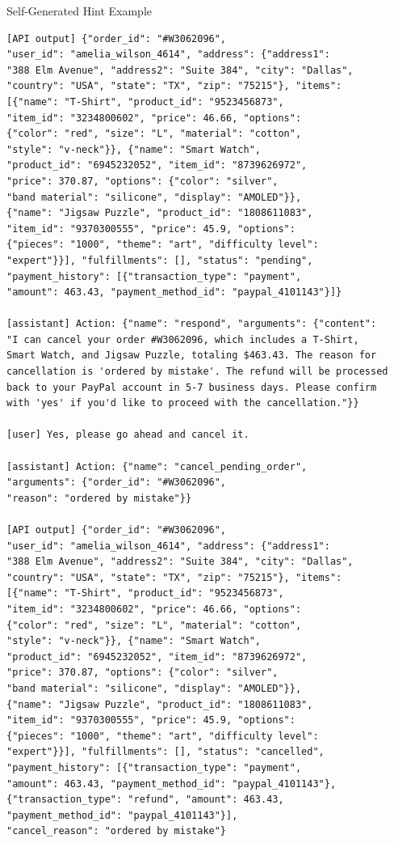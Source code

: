 \begin{prompt}{Self-Generated Hint Example}
\begin{lstlisting}
[API output] {"order_id": "#W3062096", 
"user_id": "amelia_wilson_4614", "address": {"address1": 
"388 Elm Avenue", "address2": "Suite 384", "city": "Dallas", 
"country": "USA", "state": "TX", "zip": "75215"}, "items": 
[{"name": "T-Shirt", "product_id": "9523456873", 
"item_id": "3234800602", "price": 46.66, "options": 
{"color": "red", "size": "L", "material": "cotton", 
"style": "v-neck"}}, {"name": "Smart Watch", 
"product_id": "6945232052", "item_id": "8739626972", 
"price": 370.87, "options": {"color": "silver", 
"band material": "silicone", "display": "AMOLED"}}, 
{"name": "Jigsaw Puzzle", "product_id": "1808611083", 
"item_id": "9370300555", "price": 45.9, "options": 
{"pieces": "1000", "theme": "art", "difficulty level": 
"expert"}}], "fulfillments": [], "status": "pending", 
"payment_history": [{"transaction_type": "payment", 
"amount": 463.43, "payment_method_id": "paypal_4101143"}]}

[assistant] Action: {"name": "respond", "arguments": {"content": 
"I can cancel your order #W3062096, which includes a T-Shirt, 
Smart Watch, and Jigsaw Puzzle, totaling $463.43. The reason for 
cancellation is 'ordered by mistake'. The refund will be processed 
back to your PayPal account in 5-7 business days. Please confirm 
with 'yes' if you'd like to proceed with the cancellation."}}

[user] Yes, please go ahead and cancel it.

[assistant] Action: {"name": "cancel_pending_order", 
"arguments": {"order_id": "#W3062096", 
"reason": "ordered by mistake"}}

[API output] {"order_id": "#W3062096", 
"user_id": "amelia_wilson_4614", "address": {"address1": 
"388 Elm Avenue", "address2": "Suite 384", "city": "Dallas", 
"country": "USA", "state": "TX", "zip": "75215"}, "items": 
[{"name": "T-Shirt", "product_id": "9523456873", 
"item_id": "3234800602", "price": 46.66, "options": 
{"color": "red", "size": "L", "material": "cotton", 
"style": "v-neck"}}, {"name": "Smart Watch", 
"product_id": "6945232052", "item_id": "8739626972", 
"price": 370.87, "options": {"color": "silver", 
"band material": "silicone", "display": "AMOLED"}}, 
{"name": "Jigsaw Puzzle", "product_id": "1808611083", 
"item_id": "9370300555", "price": 45.9, "options": 
{"pieces": "1000", "theme": "art", "difficulty level": 
"expert"}}], "fulfillments": [], "status": "cancelled", 
"payment_history": [{"transaction_type": "payment", 
"amount": 463.43, "payment_method_id": "paypal_4101143"}, 
{"transaction_type": "refund", "amount": 463.43, 
"payment_method_id": "paypal_4101143"}], 
"cancel_reason": "ordered by mistake"}


\end{lstlisting}
\end{prompt}

